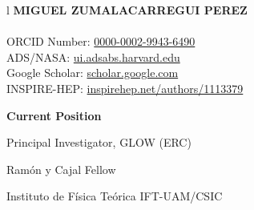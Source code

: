 \documentclass[11pt,a4paper]{article}
\begin{document}
\hspace{-.9cm}
\begin{tabular}{l}
{\LARGE{\bf \color{sectioncolor} MIGUEL ZUMALACARREGUI PEREZ}}\\
{}\\[.3cm]
ORCID Number: \href{https://orcid.org/0000-0002-9943-6490}{0000-0002-9943-6490}\\
ADS/NASA: \href{https://ui.adsabs.harvard.edu/search/fq=%7B!type%3Daqp%20v%3D%24fq_database%7D&fq_database=(database%3Aastronomy%20OR%20database%3Aphysics)&q=author%3A%22Zumalacarregui%2C%20Miguel%22&sort=date%20desc%2C%20bibcode%20desc&p_=0}{ui.adsabs.harvard.edu}\\
Google Scholar: \href{https://scholar.google.com/citations?user=Zsvsq0MAAAAJ&hl=en}{scholar.google.com}\\
INSPIRE-HEP: \href{https://inspirehep.net/authors/1113379?ui-citation-summary=true}{inspirehep.net/authors/1113379}

\end{tabular}




\vspace{-2cm}

\hspace{8.65cm}
{\bf{Current Position}} %
\vspace{-0.01cm}

\hspace{8.7cm} Principal Investigator, GLOW (ERC)

\vspace{-0.05cm}

\hspace{8.7cm} Ram\'on y Cajal Fellow
\vspace{-0.05cm}

\hspace{8.7cm} Instituto de F\'isica Te\'orica IFT-UAM/CSIC \vspace{-0.05cm}
\end{document}
